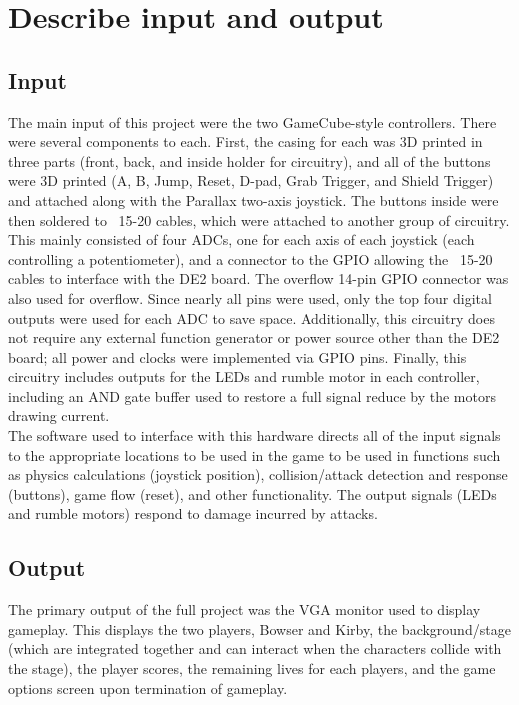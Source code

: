 \documentclass[12pt]{article} %
\begin{document}
\section{Describe input and output}
\subsection{Input}
The main input of this project were the two GameCube-style controllers. There were several components to each. First, the casing for each was 3D printed in three parts (front, back, and inside holder for circuitry), and all of the buttons were 3D printed (A, B, Jump, Reset, D-pad, Grab Trigger, and Shield Trigger) and attached along with the Parallax two-axis joystick. The buttons inside were then soldered to ~15-20 cables, which were attached to another group of circuitry. This mainly consisted of four ADCs, one for each axis of each joystick (each controlling a potentiometer), and a connector to the GPIO allowing the ~15-20 cables to interface with the DE2 board. The overflow 14-pin GPIO connector was also used for overflow. Since nearly all pins were used, only the top four digital outputs were used for each ADC to save space. Additionally, this circuitry does not require any external function generator or power source other than the DE2 board; all power and clocks were implemented via GPIO pins. Finally, this circuitry includes outputs for the LEDs and rumble motor in each controller, including an AND gate buffer used to restore a full signal reduce by the motors drawing current.\\

The software used to interface with this hardware directs all of the input signals to the appropriate locations to be used in the game to be used in functions such as physics calculations (joystick position), collision/attack detection and response (buttons), game flow (reset), and other functionality. The output signals (LEDs and rumble motors) respond to damage incurred by attacks.

\subsection{Output}
The primary output of the full project was the VGA monitor used to display gameplay. This displays the two players, Bowser and Kirby, the background/stage (which are integrated together and can interact when the characters collide with the stage), the player scores, the remaining lives for each players, and the game options screen upon termination of gameplay.\\
\end{document}
